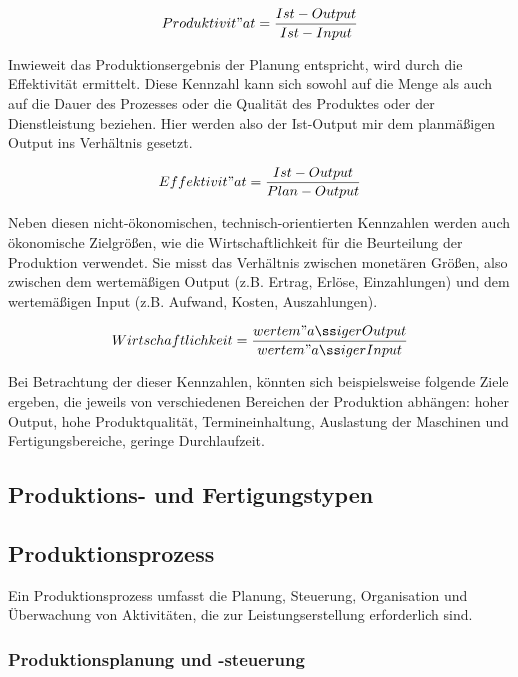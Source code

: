 \documentclass[a4paper,12pt, german]{report}
\begin{document}
\begin{equation}
  Produktivit"at =\frac{Ist-Output}{Ist-Input}
\end{equation}

Inwieweit das Produktionsergebnis der Planung entspricht, wird durch die Effektivität ermittelt. Diese Kennzahl kann sich sowohl auf die Menge als auch auf die Dauer des Prozesses oder die Qualität des Produktes oder der Dienstleistung beziehen. Hier werden also der Ist-Output mir dem planmäßigen Output ins Verhältnis gesetzt.\cite{20}

\begin{equation}
  Effektivit"at =\frac{Ist-Output}{Plan-Output}
\end{equation}


Neben diesen nicht-ökonomischen, technisch-orientierten Kennzahlen werden auch ökonomische Zielgrößen, wie die Wirtschaftlichkeit für die Beurteilung der Produktion verwendet. Sie misst das Verhältnis zwischen monetären Größen, also zwischen dem wertemäßigen Output (z.B. Ertrag, Erlöse, Einzahlungen) und dem wertemäßigen Input (z.B. Aufwand, Kosten, Auszahlungen).\cite{7}

\begin{equation}
  Wirtschaftlichkeit =\frac{wertem"aßiger Output}{wertem"aßiger Input}
\end{equation}

Bei Betrachtung der dieser Kennzahlen, könnten sich beispielsweise folgende Ziele ergeben, die jeweils von verschiedenen Bereichen der Produktion abhängen: hoher Output, hohe Produktqualität, Termineinhaltung, Auslastung der Maschinen und Fertigungsbereiche, geringe Durchlaufzeit. 

\subsection{Produktions- und Fertigungstypen}

\subsection{Produktionsprozess}

Ein Produktionsprozess umfasst die Planung, Steuerung, Organisation und Überwachung von Aktivitäten, die zur Leistungserstellung erforderlich sind. 

\subsubsection{Produktionsplanung und -steuerung}
\end{document}
